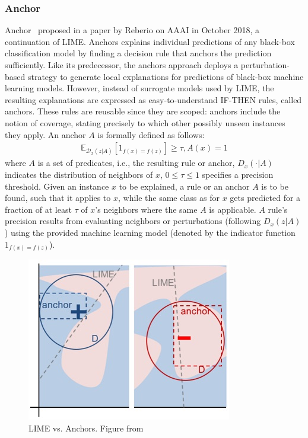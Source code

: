 \subsubsection{Anchor}
Anchor~\cite{ribeiro2018anchors} proposed in a paper by Reberio on AAAI in October 2018, a continuation of LIME. Anchors explains individual predictions of any black-box classification model by finding a decision rule that anchors the prediction sufficiently. Like its predecessor, the anchors approach deploys a perturbation-based strategy to generate local explanations for predictions of black-box machine learning models. However, instead of surrogate models used by LIME, the resulting explanations are expressed as easy-to-understand IF-THEN rules, called anchors. These rules are reusable since they are scoped: anchors include the notion of coverage, stating precisely to which other possibly unseen instances they apply. 
An anchor $A$ is formally defined as follows:
\begin{equation}
\begin{aligned}
\mathbb{E}_{\mathcal{D}_x(z|A)}[1_{f(x)=f(z)}]\geq\tau,A(x)=1
\end{aligned}
\label{eqn:eq2}
\end{equation}
where $A$ is a set of predicates, i.e., the resulting rule or anchor, $D_x (\cdot|A)$ indicates the distribution of neighbors of $x$, $0 \leq \tau \leq 1$ specifies a precision threshold. Given an instance $x$ to be explained, a rule or an anchor $A$ is to be found, such that it applies to $x$, while the same class as for $x$ gets predicted for a fraction of at least $\tau$ of $x$'s neighbors where the same $A$ is applicable. $A$ rule's precision results from evaluating neighbors or perturbations (following $D_x (z|A)$) using the provided machine learning model (denoted by the indicator function $1_{f(x) = f(z)}$).
\begin{figure}[H]
\centering
\includegraphics[width=0.5\columnwidth]{gfx/anchors-visualization.jpg}
\caption{LIME vs. Anchors. Figure from ~\cite{ribeiro2018anchors}}
\label{fig:Anchors}
\end{figure}

